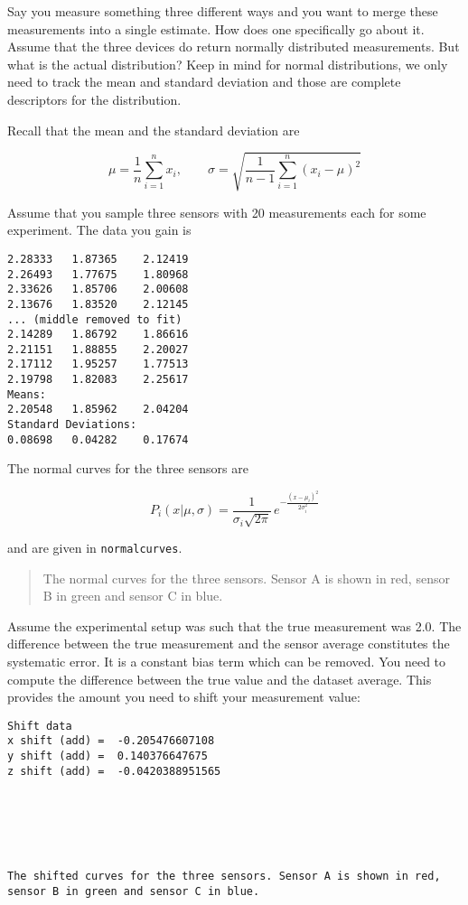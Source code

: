 Say you measure something three different ways and you want to merge
these measurements into a single estimate. How does one specifically go
about it. Assume that the three devices do return normally distributed
measurements. But what is the actual distribution? Keep in mind for
normal distributions, we only need to track the mean and standard
deviation and those are complete descriptors for the distribution.

Recall that the mean and the standard deviation are

\[\mu = \frac{1}{n}\sum_{i=1}^n x_i, \quad\quad\sigma = \sqrt{\frac{1}{n-1} \sum_{i=1}^n (x_i - \mu)^2}\]

Assume that you sample three sensors with 20 measurements each for some
experiment. The data you gain is

\begin{verbatim}
2.28333   1.87365    2.12419
2.26493   1.77675    1.80968
2.33626   1.85706    2.00608
2.13676   1.83520    2.12145
... (middle removed to fit)
2.14289   1.86792    1.86616
2.21151   1.88855    2.20027
2.17112   1.95257    1.77513
2.19798   1.82083    2.25617
Means:
2.20548   1.85962    2.04204
Standard Deviations:
0.08698   0.04282    0.17674
\end{verbatim}

The normal curves for the three sensors are

\[P_i(x|\mu, \sigma) = \displaystyle\frac{1}{\sigma_i\sqrt{2\pi}}\, e^{\displaystyle-\frac{(x-\mu_i)^2}{2\sigma_i^2}}\]

and are given in \texttt{normalcurves}.

\begin{quote}
The normal curves for the three sensors. Sensor A is shown in red,
sensor B in green and sensor C in blue.
\end{quote}

Assume the experimental setup was such that the true measurement was
2.0. The difference between the true measurement and the sensor average
constitutes the systematic error. It is a constant bias term which can
be removed. You need to compute the difference between the true value
and the dataset average. This provides the amount you need to shift your
measurement value:

\begin{verbatim}
Shift data
x shift (add) =  -0.205476607108
y shift (add) =  0.140376647675
z shift (add) =  -0.0420388951565






The shifted curves for the three sensors. Sensor A is shown in red,
sensor B in green and sensor C in blue.
\end{verbatim}

